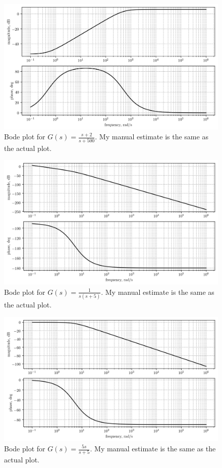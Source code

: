 \documentclass[12pt,a4paper]{article}
\begin{document}
\begin{figure}[!h]
	\centering
	\includegraphics[width=\linewidth]{5.png}
	\caption{Bode plot for $G(s) = \frac{s+2}{s+500}$. My manual estimate is the same as the actual plot.}
\end{figure}

\begin{figure}[!h]
	\centering
	\includegraphics[width=\linewidth]{6.png}
	\caption{Bode plot for $G(s) = \frac{1}{s(s+5)}$. My manual estimate is the same as the actual plot.}
\end{figure}

\begin{figure}[!h]
	\centering
	\includegraphics[width=\linewidth]{7.png}
	\caption{Bode plot for $G(s) = \frac{5s}{s+5}$. My manual estimate is the same as the actual plot.}
\end{figure}
\end{document}
